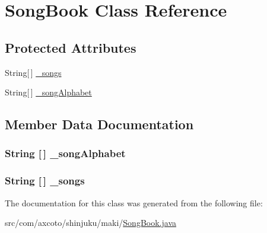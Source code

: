 \hypertarget{classcom_1_1axcoto_1_1shinjuku_1_1maki_1_1_song_book}{\section{\-Song\-Book \-Class \-Reference}
\label{classcom_1_1axcoto_1_1shinjuku_1_1maki_1_1_song_book}
}
\subsection*{\-Protected \-Attributes}
\begin{DoxyCompactItemize}
\item 
\-String\mbox{[}$\,$\mbox{]} \hyperlink{classcom_1_1axcoto_1_1shinjuku_1_1maki_1_1_song_book_a950a5efe90d47b263b2c46d6d369b8ee}{\-\_\-songs}
\item 
\-String\mbox{[}$\,$\mbox{]} \hyperlink{classcom_1_1axcoto_1_1shinjuku_1_1maki_1_1_song_book_a5cf3a460a4bf6127af0a08b57a4747ee}{\-\_\-song\-Alphabet}
\end{DoxyCompactItemize}


\subsection{\-Member \-Data \-Documentation}
\hypertarget{classcom_1_1axcoto_1_1shinjuku_1_1maki_1_1_song_book_a5cf3a460a4bf6127af0a08b57a4747ee}{
\subsubsection[{\-\_\-song\-Alphabet}]{\setlength{\rightskip}{0pt plus 5cm}\-String \mbox{[}$\,$\mbox{]} {\bf \-\_\-song\-Alphabet}}}\label{classcom_1_1axcoto_1_1shinjuku_1_1maki_1_1_song_book_a5cf3a460a4bf6127af0a08b57a4747ee}
\hypertarget{classcom_1_1axcoto_1_1shinjuku_1_1maki_1_1_song_book_a950a5efe90d47b263b2c46d6d369b8ee}{
\subsubsection[{\-\_\-songs}]{\setlength{\rightskip}{0pt plus 5cm}\-String \mbox{[}$\,$\mbox{]} {\bf \-\_\-songs}}}\label{classcom_1_1axcoto_1_1shinjuku_1_1maki_1_1_song_book_a950a5efe90d47b263b2c46d6d369b8ee}


\-The documentation for this class was generated from the following file\-:\begin{DoxyCompactItemize}
\item 
src/com/axcoto/shinjuku/maki/\hyperlink{_song_book_8java}{\-Song\-Book.\-java}\end{DoxyCompactItemize}
